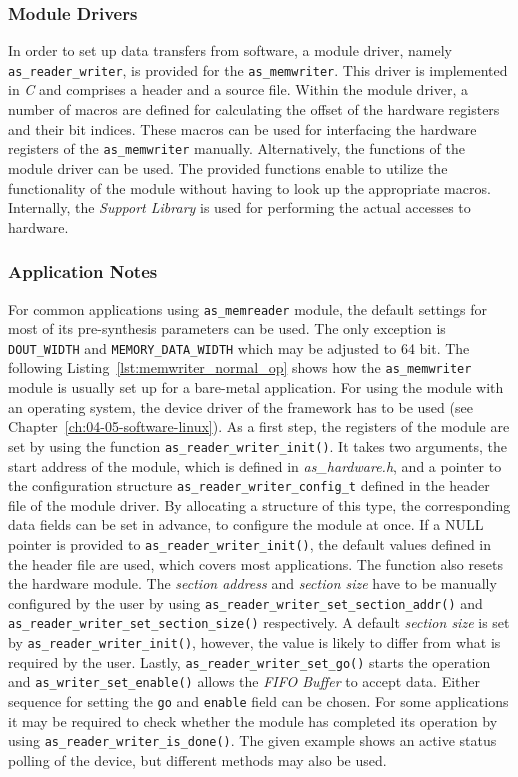 \subsubsection{Module Drivers}
In order to set up data transfers from software, a module driver, namely \texttt{as\_reader\_writer}, is provided for the \texttt{as\_memwriter}.
This driver is implemented in \textit{C} and comprises a header and a source file.
Within the module driver, a number of macros are defined for calculating the offset of the hardware registers and their bit indices.
These macros can be used for interfacing the hardware registers of the \texttt{as\_memwriter} manually.
Alternatively, the functions of the module driver can be used. 
The provided functions enable to utilize the functionality of the module without having to look up the appropriate macros.
Internally, the \textit{\asterics Support Library} is used for performing the actual accesses to hardware.


\subsubsection{Application Notes}

For common applications using \texttt{as\_memreader} module, the default settings for most of its pre-synthesis parameters can be used.
The only exception is \texttt{DOUT\_WIDTH} and \texttt{MEMORY\_DATA\_WIDTH} which may be adjusted to 64 bit.
The following Listing~\ref{lst:memwriter_normal_op} shows how the \texttt{as\_memwriter} module is usually set up for a bare-metal application.
For using the module with an operating system, the device driver of the \asterics framework has to be used (see Chapter~\ref{ch:04-05-software-linux}).
As a first step, the registers of the module are set by using the function \texttt{as\_reader\_writer\_init()}.
It takes two arguments, the start address of the module, which is defined in \textit{as\_hardware.h}, and a pointer to the configuration structure \texttt{as\_reader\_writer\_config\_t} defined in the header file of the module driver.
By allocating a structure of this type, the corresponding data fields can be set in advance, to configure the module at once.
If a NULL pointer is provided to \texttt{as\_reader\_writer\_init()}, the default values defined in the header file are used, which covers most applications.
The function also resets the hardware module.
The \textit{section address} and \textit{section size} have to be manually configured by the user by using \texttt{as\_reader\_writer\_set\_section\_addr()} and \texttt{as\_reader\_writer\_set\_section\_size()} respectively.
A default \textit{section size} is set by \texttt{as\_reader\_writer\_init()}, however, the value is likely to differ from what is required by the user.
Lastly, \texttt{as\_reader\_writer\_set\_go()} starts the operation and \texttt{as\_writer\_set\_enable()} allows the \textit{FIFO Buffer} to accept data.
Either sequence for setting the \texttt{go} and \texttt{enable} field can be chosen.
For some applications it may be required to check whether the module has completed its operation by using \texttt{as\_reader\_writer\_is\_done()}.
The given example shows an active status polling of the device, but different methods may also be used.

